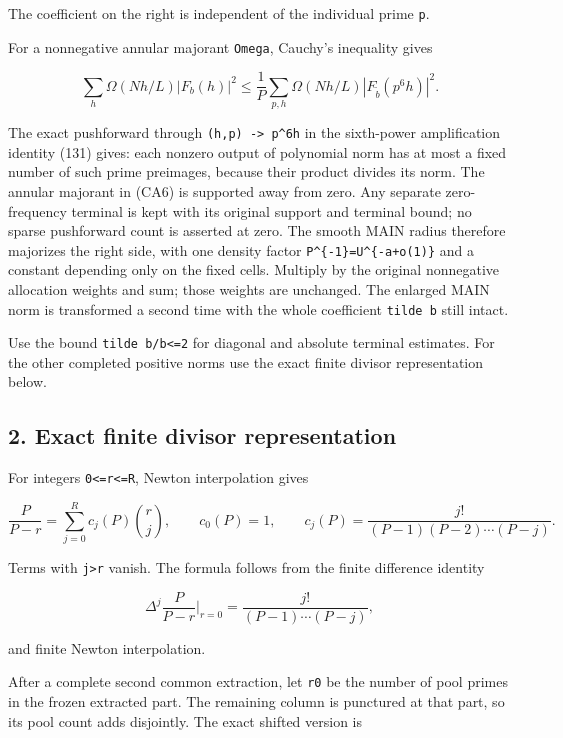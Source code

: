The coefficient on the right is independent of the individual prime \texttt{p}.

For a nonnegative annular majorant \texttt{Omega}, Cauchy's inequality gives

\[
 \sum_h\Omega(Nh/L)|F_b(h)|^2
 \le\frac1P\sum_{p,h}\Omega(Nh/L)
                      |F_{\widetilde b}(p^6h)|^2.
\tag{CA6}
\]

The exact pushforward through \texttt{(h,p)\ -\textgreater{}\ p\^{}6h} in the sixth-power amplification identity (131) gives: each nonzero output of polynomial norm has at most a fixed number of such prime preimages, because their product divides its norm. The annular majorant in (CA6) is supported away from zero. Any separate zero-frequency terminal is kept with its original support and terminal bound; no sparse pushforward count is asserted at zero. The smooth MAIN radius therefore majorizes the right side, with one density factor \texttt{P\^{}\{-1\}=U\^{}\{-a+o(1)\}} and a constant depending only on the fixed cells. Multiply by the original nonnegative allocation weights and sum; those weights are unchanged. The enlarged MAIN norm is transformed a second time with the whole coefficient \texttt{tilde\ b} still intact.

Use the bound \texttt{\textbar{}tilde\ b/b\textbar{}\textless{}=2} for diagonal and absolute terminal estimates. For the other completed positive norms use the exact finite divisor representation below.

\hypertarget{sources:exact-finite-divisor-representation}{%
\subsection{2. Exact finite divisor representation}\label{sources:exact-finite-divisor-representation}}

For integers \texttt{0\textless{}=r\textless{}=R}, Newton interpolation gives

\[
 \frac{P}{P-r}
 =\sum_{j=0}^{R}c_j(P)\binom rj,
 \qquad c_0(P)=1,\qquad
 c_j(P)=\frac{j!}{(P-1)(P-2)\cdots(P-j)}.
\tag{CA7}
\]

Terms with \texttt{j\textgreater{}r} vanish. The formula follows from the finite difference identity

\[
 \Delta^j\frac{P}{P-r}\bigg|_{r=0}
 =\frac{j!}{(P-1)\cdots(P-j)},
\]

and finite Newton interpolation.

After a complete second common extraction, let \texttt{r0} be the number of pool primes in the frozen extracted part. The remaining column is punctured at that part, so its pool count adds disjointly. The exact shifted version is

